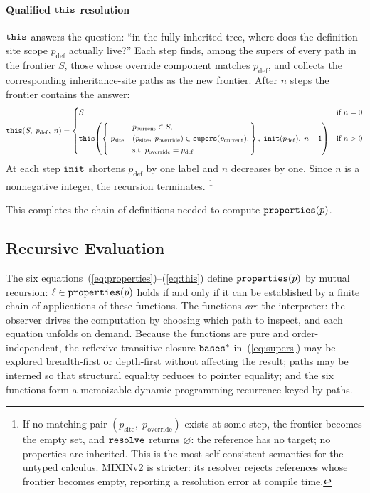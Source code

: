 \paragraph{Qualified $\mathtt{this}$ resolution}
$\mathtt{this}$ answers the question:
``in the fully inherited tree, where does
the definition-site scope $p_{\mathrm{def}}$ actually live?''
Each step finds, among the supers of every path in the
frontier $S$, those whose override component matches
$p_{\mathrm{def}}$, and collects the corresponding
inheritance-site paths as the new frontier.
After $n$ steps the frontier contains the answer:
{\small
  \begin{equation}\label{eq:this}
    \mathtt{this}(S,\; p_{\mathrm{def}},\; n) =
    \begin{cases}
      S & \text{if } n = 0 \\[6pt]
      \mathtt{this}\!\left(
        \left\{\; p_{\mathrm{site}} \;\left|\;
          \begin{aligned}
            &p_{\mathrm{current}} \in S, \\
            &(p_{\mathrm{site}},\; p_{\mathrm{override}})
            \in \mathtt{supers}(p_{\mathrm{current}}), \\
            &\text{s.t.}\; p_{\mathrm{override}} = p_{\mathrm{def}}
          \end{aligned}
        \right.\right\},\;
        \mathtt{init}(p_{\mathrm{def}}),\;
        n - 1
      \right)
      & \text{if } n > 0
    \end{cases}
\end{equation}}%
At each step $\mathtt{init}$ shortens $p_{\mathrm{def}}$ by one label
and $n$ decreases by one.
Since $n$ is a nonnegative integer, the recursion terminates.%
\footnote{
  If no matching pair
  $(p_{\mathrm{site}},\; p_{\mathrm{override}})$ exists
  at some step, the frontier becomes the empty set, and
  $\mathtt{resolve}$ returns $\varnothing$: the reference has no
  target; no properties are inherited.
  This is the most self-consistent semantics for the
  untyped calculus.
  MIXINv2 is stricter: its resolver rejects
  references whose frontier becomes empty, reporting a
  resolution error at compile time.
}

This completes the chain of definitions needed to compute $\mathtt{properties}(p)$.

\subsection{Recursive Evaluation}
The six equations~(\ref{eq:properties})--(\ref{eq:this})
define $\mathtt{properties}(p)$ by mutual recursion:
$\ell \in \mathtt{properties}(p)$ holds if and only if it can
be established by a finite chain of applications of
these functions.
The functions \emph{are} the interpreter: the observer
drives the computation by choosing which path to
inspect, and each equation unfolds on demand.
Because the functions are pure and order-independent,
the reflexive-transitive closure $\mathtt{bases}^*$
in~(\ref{eq:supers}) may be explored breadth-first or
depth-first without affecting the result;
paths may be interned so that structural equality
reduces to pointer equality;
and the six functions form a memoizable
dynamic-programming recurrence keyed by paths.

